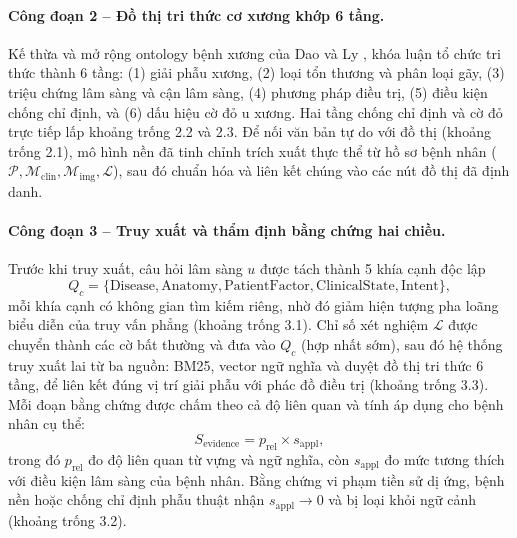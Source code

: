 \paragraph{Công đoạn 2 -- Đồ thị tri thức cơ xương khớp 6 tầng.}
Kế thừa và mở rộng ontology bệnh xương của Dao và Ly \cite{dao2025ontology}, khóa luận tổ chức tri thức thành 6 tầng: (1) giải phẫu xương, (2) loại tổn thương và phân loại gãy, (3) triệu chứng lâm sàng và cận lâm sàng, (4) phương pháp điều trị, (5) điều kiện chống chỉ định, và (6) dấu hiệu cờ đỏ u xương. Hai tầng chống chỉ định và cờ đỏ trực tiếp lấp khoảng trống 2.2 và 2.3. Để nối văn bản tự do với đồ thị (khoảng trống 2.1), mô hình nền đã tinh chỉnh trích xuất thực thể từ hồ sơ bệnh nhân ($\mathcal{P}, \mathcal{M}_{\mathrm{clin}}, \mathcal{M}_{\mathrm{img}}, \mathcal{L}$), sau đó chuẩn hóa và liên kết chúng vào các nút đồ thị đã định danh.

\paragraph{Công đoạn 3 -- Truy xuất và thẩm định bằng chứng hai chiều.}
Trước khi truy xuất, câu hỏi lâm sàng $u$ được tách thành 5 khía cạnh độc lập
\begin{equation}
    Q_c = \{\text{Disease}, \text{Anatomy}, \text{PatientFactor}, \text{ClinicalState}, \text{Intent}\},
\end{equation}
mỗi khía cạnh có không gian tìm kiếm riêng, nhờ đó giảm hiện tượng pha loãng biểu diễn của truy vấn phẳng (khoảng trống 3.1). Chỉ số xét nghiệm $\mathcal{L}$ được chuyển thành các cờ bất thường và đưa vào $Q_c$ (hợp nhất sớm), sau đó hệ thống truy xuất lai từ ba nguồn: BM25, vector ngữ nghĩa và duyệt đồ thị tri thức 6 tầng, để liên kết đúng vị trí giải phẫu với phác đồ điều trị (khoảng trống 3.3). Mỗi đoạn bằng chứng được chấm theo cả độ liên quan và tính áp dụng cho bệnh nhân cụ thể:
\begin{equation}
    S_{\mathrm{evidence}} = p_{\mathrm{rel}} \times s_{\mathrm{appl}},
\end{equation}
trong đó $p_{\mathrm{rel}}$ đo độ liên quan từ vựng và ngữ nghĩa, còn $s_{\mathrm{appl}}$ đo mức tương thích với điều kiện lâm sàng của bệnh nhân. Bằng chứng vi phạm tiền sử dị ứng, bệnh nền hoặc chống chỉ định phẫu thuật nhận $s_{\mathrm{appl}} \to 0$ và bị loại khỏi ngữ cảnh (khoảng trống 3.2).

